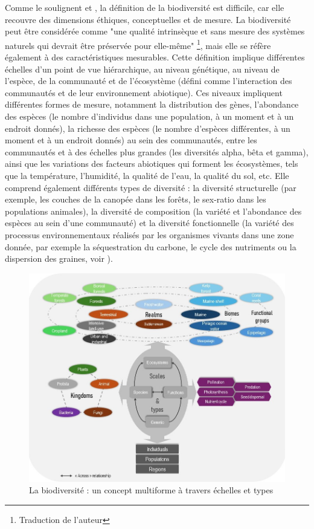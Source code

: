 Comme le soulignent \cite{VanDyke2008} et \cite{mouysset_diversity_2023}, la définition de la biodiversité est difficile, car elle recouvre des dimensions éthiques, conceptuelles et de mesure. La biodiversité peut être considérée comme "une qualité intrinsèque et sans mesure des systèmes naturels qui devrait être préservée pour elle-même" \citep{VanDyke2008, mouysset_diversity_2023}\footnote{Traduction de l'auteur}, mais elle se réfère également à des caractéristiques mesurables.
%
Cette définition implique différentes échelles d'un point de vue hiérarchique, au niveau génétique, au niveau de l'espèce, de la communauté et de l'écosystème (défini comme l'interaction des communautés et de leur environnement abiotique). Ces niveaux impliquent différentes formes de mesure, notamment la distribution des gènes, l'abondance des espèces (le nombre d'individus dans une population, à un moment et à un endroit donnés), la richesse des espèces (le nombre d'espèces différentes, à un moment et à un endroit donnés) au sein des communautés, entre les communautés et à des échelles plus grandes (les diversités alpha, bêta et gamma), ainsi que les variations des facteurs abiotiques qui forment les écosystèmes, tels que la température, l'humidité, la qualité de l'eau, la qualité du sol, etc. 
Elle comprend également différents types de diversité : la diversité structurelle (par exemple, les couches de la canopée dans les forêts, le sex-ratio dans les populations animales), la diversité de composition (la variété et l'abondance des espèces au sein d'une communauté) et la diversité fonctionnelle (la variété des processus environnementaux réalisés par les organismes vivants dans une zone donnée, par exemple la séquestration du carbone, le cycle des nutriments ou la dispersion des graines, voir \cite{loreau_biodiversity_2002}).

\begin{figure}
	\centering
	\includegraphics[width =.8\textwidth]{figures/intro/biodiv_illustration.jpg}
	\caption{ La biodiversité : un concept multiforme à travers échelles et types}
	\label{fig:intro_biod_french}
\end{figure}

